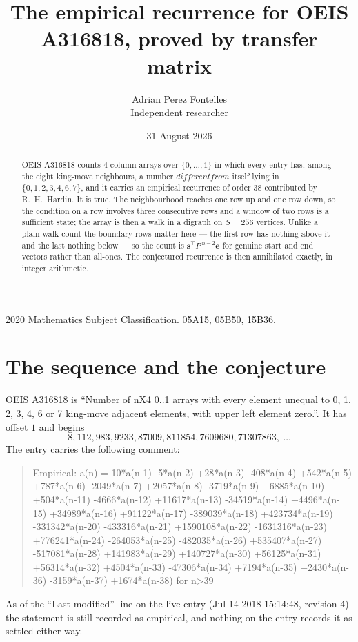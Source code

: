 \documentclass[11pt,a4paper]{article}
\title{The empirical recurrence for OEIS A316818, proved by transfer matrix}
\author{Adrian Perez Fontelles\\ \small Independent researcher}
\date{31 August 2026}
\theoremstyle{plain}
\theoremstyle{definition}
\begin{document}
\maketitle

\begin{abstract}
OEIS A316818 counts $4$-column arrays over $\{0,\dots,1\}$ in which every entry has,
among the eight king-move neighbours, a number $different from$ itself lying in $\{0,1,2,3,4,6,7\}$, and it carries an empirical
recurrence of order $38$ contributed by R.~H.~Hardin. It is true. The neighbourhood
reaches one row up and one row down, so the condition on a row involves three consecutive
rows and a window of two rows is a sufficient state; the array is then a walk in a digraph
on $S=256$ vertices. Unlike a plain walk count the boundary rows matter here --- the first
row has nothing above it and the last nothing below --- so the count is
$\mathbf{s}^{\!\top}P^{\,n-2}\mathbf{e}$ for genuine start and end vectors rather than
all-ones. The conjectured recurrence is then annihilated exactly, in integer arithmetic.
\end{abstract}

\noindent\small 2020 Mathematics Subject Classification. 05A15, 05B50, 15B36.\normalsize

\section{The sequence and the conjecture}

OEIS A316818 is ``Number of nX4 0..1 arrays with every element unequal to 0, 1, 2, 3, 4, 6 or 7 king-move adjacent elements, with upper left element zero.''. It has offset
$1$ and begins
\[
8, 112, 983, 9233, 87009, 811854, 7609680, 71307863,\ \dots
\]
The entry carries the following comment:
\begin{quote}\small
Empirical: a(n) = 10*a(n-1) -5*a(n-2) +28*a(n-3) -408*a(n-4) +542*a(n-5) +787*a(n-6) -2049*a(n-7) +2057*a(n-8) -3719*a(n-9) +6885*a(n-10) +504*a(n-11) -4666*a(n-12) +11617*a(n-13) -34519*a(n-14) +4496*a(n-15) +34989*a(n-16) +91122*a(n-17) -389039*a(n-18) +423734*a(n-19) -331342*a(n-20) -433316*a(n-21) +1590108*a(n-22) -1631316*a(n-23) +776241*a(n-24) -264053*a(n-25) -482035*a(n-26) +535407*a(n-27) -517081*a(n-28) +141983*a(n-29) +140727*a(n-30) +56125*a(n-31) +56314*a(n-32) +4504*a(n-33) -47306*a(n-34) +7194*a(n-35) +2430*a(n-36) -3159*a(n-37) +1674*a(n-38) for n>39
\end{quote}
As of the ``Last modified'' line on the live entry (Jul 14 2018 15:14:48, revision
4) the statement is still recorded as empirical, and nothing on the entry
records it as settled either way.
\end{document}
